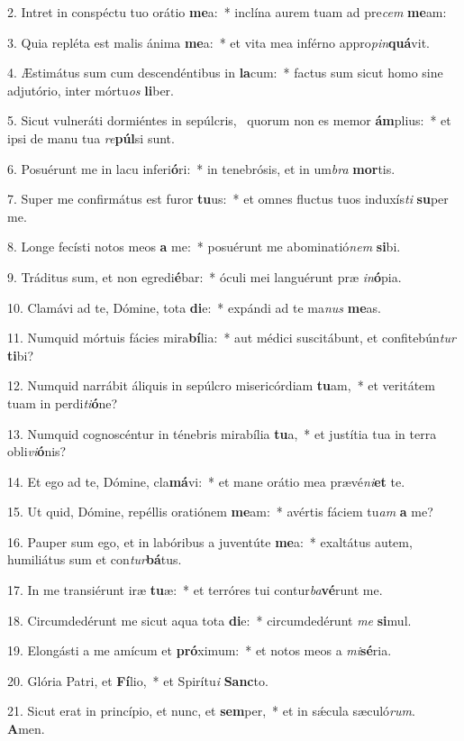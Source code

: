 2. Intret in conspéctu tuo orátio \textbf{me}a:~*  inclína aurem tuam ad pre\textit{cem} \textbf{me}am:\

3. Quia repléta est malis ánima \textbf{me}a:~*  et vita mea inférno appro\textit{pin}\textbf{quá}vit.\

4. Æstimátus sum cum descendéntibus in \textbf{la}cum:~*  factus sum sicut homo sine adjutório, inter mórtu\textit{os} \textbf{li}ber.\

5. Sicut vulneráti dormiéntes in sepúlcris, \dag\  quorum non es memor \textbf{ám}plius:~*  et ipsi de manu tua \textit{re}\textbf{púl}si sunt.\

6. Posuérunt me in lacu inferi\textbf{ó}ri:~*  in tenebrósis, et in um\textit{bra} \textbf{mor}tis.\

7. Super me confirmátus est furor \textbf{tu}us:~*  et omnes fluctus tuos induxís\textit{ti} \textbf{su}per me.\

8. Longe fecísti notos meos \textbf{a} me:~*  posuérunt me abominatió\textit{nem} \textbf{si}bi.\

9. Tráditus sum, et non egredi\textbf{é}bar:~*  óculi mei languérunt præ \textit{in}\textbf{ó}pia.\

10. Clamávi ad te, Dómine, tota \textbf{di}e:~*  expándi ad te ma\textit{nus} \textbf{me}as.\

11. Numquid mórtuis fácies mira\textbf{bí}lia:~*  aut médici suscitábunt, et confitebún\textit{tur} \textbf{ti}bi?\

12. Numquid narrábit áliquis in sepúlcro misericórdiam \textbf{tu}am,~*  et veritátem tuam in perdi\textit{ti}\textbf{ó}ne?\

13. Numquid cognoscéntur in ténebris mirabília \textbf{tu}a,~*  et justítia tua in terra obli\textit{vi}\textbf{ó}nis?\

14. Et ego ad te, Dómine, cla\textbf{má}vi:~*  et mane orátio mea prævé\textit{ni}\textbf{et} te.\

15. Ut quid, Dómine, repéllis oratiónem \textbf{me}am:~*  avértis fáciem tu\textit{am} \textbf{a} me?\

16. Pauper sum ego, et in labóribus a juventúte \textbf{me}a:~*  exaltátus autem, humiliátus sum et con\textit{tur}\textbf{bá}tus.\

17. In me transiérunt iræ \textbf{tu}æ:~*  et terróres tui contur\textit{ba}\textbf{vé}runt me.\

18. Circumdedérunt me sicut aqua tota \textbf{di}e:~*  circumdedérunt \textit{me} \textbf{si}mul.\

19. Elongásti a me amícum et \textbf{pró}ximum:~*  et notos meos a \textit{mi}\textbf{sé}ria.\

20. Glória Patri, et \textbf{Fí}lio,~*  et Spirítu\textit{i} \textbf{Sanc}to.\

21. Sicut erat in princípio, et nunc, et \textbf{sem}per,~*  et in sǽcula sæculó\textit{rum}. \textbf{A}men.\

